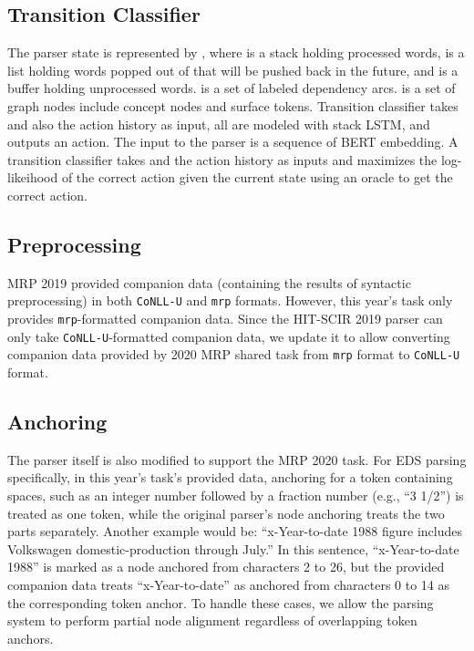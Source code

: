 \documentclass[11pt,a4paper]{article}
\begin{document}
\subsection{Transition Classifier}
The parser state is represented by , where  is a
stack holding processed words,  is a list holding words popped out of  that will be pushed back in the future, and  is a buffer holding unprocessed words.  is a set of labeled dependency arcs.  is a set of graph nodes include  concept  nodes and surface tokens. Transition classifier takes  and also the action history as input, all are modeled with stack LSTM, and outputs an action. The input to the parser is a sequence of BERT embedding. A transition classifier takes  and the action history as inputs and maximizes the log-likeihood of the correct action given the current state using an oracle to get the correct action.

\subsection{Preprocessing}\label{sec:hit-scir-preprocessing}
MRP 2019 provided companion data (containing the results of syntactic preprocessing) in both \texttt{CoNLL-U} and \texttt{mrp} formats. However, this year's task only provides \texttt{mrp}-formatted companion data.
Since the HIT-SCIR 2019 parser can only take \texttt{CoNLL-U}-formatted companion data, we update it to allow converting companion data provided by 2020 MRP shared task from \texttt{mrp} format to \texttt{CoNLL-U} format.

\subsection{Anchoring}\label{sec:hit-scir-anchoring}
The parser itself is also modified to support the MRP 2020 task. For EDS parsing specifically, in this year's task's provided data, anchoring for a token containing spaces, such as an integer number followed by a fraction number (e.g., ``3 1/2'') is treated as one token, while the original parser's node anchoring treats the two parts separately.
Another example would be: ``x-Year-to-date 1988 figure includes Volkswagen domestic-production through July.'' In this sentence, ``x-Year-to-date 1988'' is marked as a node anchored from characters 2 to 26, but the provided companion data treats ``x-Year-to-date'' as anchored from characters 0 to 14 as the corresponding token anchor. To handle these cases, we allow the parsing system to perform partial node alignment regardless of overlapping token anchors.
\end{document}
